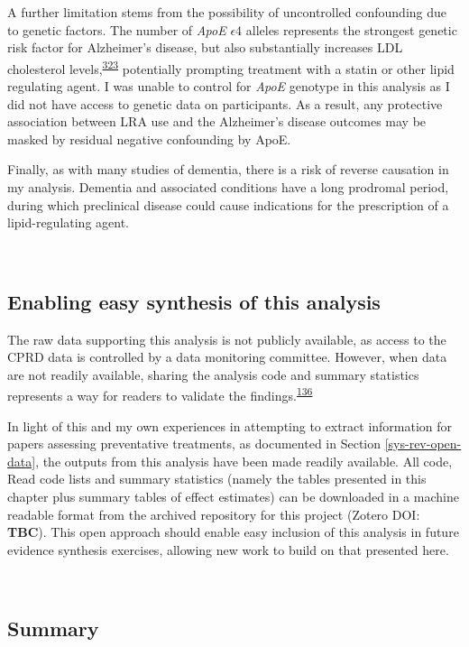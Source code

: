 \documentclass[a4paper, twoside]{templates/ociamthesis}
\begin{document}
A further limitation stems from the possibility of uncontrolled confounding due to genetic factors. The number of \emph{ApoE} \(\epsilon4\) alleles represents the strongest genetic risk factor for Alzheimer's disease, but also substantially increases LDL cholesterol levels,\textsuperscript{\protect\hyperlink{ref-bennet2007}{323}} potentially prompting treatment with a statin or other lipid regulating agent. I was unable to control for \emph{ApoE} genotype in this analysis as I did not have access to genetic data on participants. As a result, any protective association between LRA use and the Alzheimer's disease outcomes may be masked by residual negative confounding by ApoE.

Finally, as with many studies of dementia, there is a risk of reverse causation in my analysis. Dementia and associated conditions have a long prodromal period, during which preclinical disease could cause indications for the prescription of a lipid-regulating agent.

~

\hypertarget{cprd-data-avail}{%
\subsection{Enabling easy synthesis of this analysis}\label{cprd-data-avail}}

The raw data supporting this analysis is not publicly available, as access to the CPRD data is controlled by a data monitoring committee. However, when data are not readily available, sharing the analysis code and summary statistics represents a way for readers to validate the findings.\textsuperscript{\protect\hyperlink{ref-goldacre2019}{136}}

In light of this and my own experiences in attempting to extract information for papers assessing preventative treatments, as documented in Section \ref{sys-rev-open-data}, the outputs from this analysis have been made readily available. All code, Read code lists and summary statistics (namely the tables presented in this chapter plus summary tables of effect estimates) can be downloaded in a machine readable format from the archived repository for this project (Zotero DOI: \textbf{TBC}). This open approach should enable easy inclusion of this analysis in future evidence synthesis exercises, allowing new work to build on that presented here.

~

\hypertarget{summary-4}{%
\subsection{Summary}\label{summary-4}}
\end{document}

